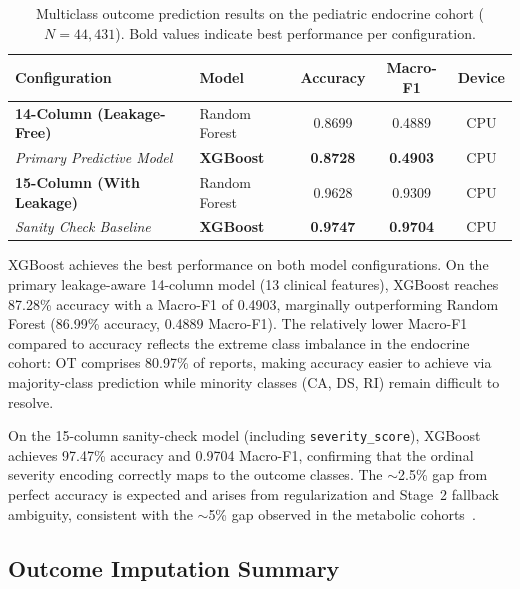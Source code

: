 \documentclass[10pt,twocolumn]{article}
\begin{document}
\begin{table}[!t]
\caption{Multiclass outcome prediction results on the pediatric endocrine cohort ($N = 44{,}431$). Bold values indicate best performance per configuration.}
\label{tab:main_results}
\centering\small\setlength{\tabcolsep}{12pt}
\begin{tabular}{|l|l|c|c|c|}
\hline
\rowcolor{tableHead}
\color{white}\textbf{Configuration} & \color{white}\textbf{Model} & \color{white}\textbf{Accuracy} & \color{white}\textbf{Macro-F1} & \color{white}\textbf{Device} \\
\hline
\rowcolor{rowA} \textbf{14-Column (Leakage-Free)} & Random Forest & 0.8699 & 0.4889 & CPU \\
\hline
\rowcolor{rowB} \emph{Primary Predictive Model} & \textbf{XGBoost} & \textbf{0.8728} & \textbf{0.4903} & CPU \\
\hline
\rowcolor{rowA} \textbf{15-Column (With Leakage)} & Random Forest & 0.9628 & 0.9309 & CPU \\
\hline
\rowcolor{rowB} \emph{Sanity Check Baseline} & \textbf{XGBoost} & \textbf{0.9747} & \textbf{0.9704} & CPU \\
\hline
\end{tabular}
\end{table}
 
XGBoost achieves the best performance on both model configurations. On the primary leakage-aware 14-column model (13 clinical features), XGBoost reaches 87.28\% accuracy with a Macro-F1 of 0.4903, marginally outperforming Random Forest (86.99\% accuracy, 0.4889 Macro-F1). The relatively lower Macro-F1 compared to accuracy reflects the extreme class imbalance in the endocrine cohort: OT comprises 80.97\% of reports, making accuracy easier to achieve via majority-class prediction while minority classes (CA, DS, RI) remain difficult to resolve.
 
On the 15-column sanity-check model (including \texttt{severity\_score}), XGBoost achieves 97.47\% accuracy and 0.9704 Macro-F1, confirming that the ordinal severity encoding correctly maps to the outcome classes. The $\sim$2.5\% gap from perfect accuracy is expected and arises from regularization and Stage~2 fallback ambiguity, consistent with the $\sim$5\% gap observed in the metabolic cohorts~\cite{telkar2026obesity}.
 
\subsection{Outcome Imputation Summary}
\label{sec:imputation_summary}
 
\end{document}
